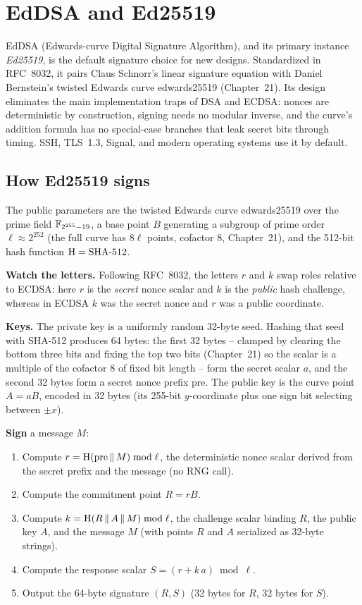 \section{EdDSA and Ed25519}
\label{ch22:eddsa}

EdDSA (Edwards-curve Digital Signature Algorithm), and its primary instance \emph{Ed25519},
is the default signature choice for new designs. Standardized in RFC~8032, it pairs Claus Schnorr's
linear signature equation with Daniel Bernstein's twisted Edwards curve edwards25519 (Chapter~21).
Its design eliminates the main implementation traps of DSA and ECDSA: nonces are deterministic by
construction, signing needs no modular inverse, and the curve's addition formula has no special-case
branches that leak secret bits through timing. SSH, TLS~1.3, Signal, and modern operating systems
use it by default.

\subsection{How Ed25519 signs}
\label{ch22:ed25519-algo}

The public parameters are the twisted Edwards curve edwards25519 over the prime field $\mathbb{F}_{2^{255}-19}$, a base point $B$ generating a subgroup of prime order $\ell \approx 2^{252}$ (the full curve has $8\ell$ points, cofactor $8$, Chapter~21), and the 512-bit hash function $\operatorname{H} = \text{SHA-512}$.

\textbf{Watch the letters.} Following RFC~8032, the letters $r$ and $k$ swap roles relative to ECDSA: here $r$ is the \emph{secret} nonce scalar and $k$ is the \emph{public} hash challenge, whereas in ECDSA $k$ was the secret nonce and $r$ was a public coordinate.

\textbf{Keys.} The private key is a uniformly random 32-byte seed. Hashing that seed with SHA-512 produces 64 bytes: the first 32 bytes -- clamped by clearing the bottom three bits and fixing the top two bits (Chapter~21) so the scalar is a multiple of the cofactor $8$ of fixed bit length -- form the secret scalar $a$, and the second 32 bytes form a secret nonce prefix $\mathrm{pre}$. The public key is the curve point $A = aB$, encoded in 32 bytes (its 255-bit $y$-coordinate plus one sign bit selecting between $\pm x$).

\textbf{Sign} a message $M$:
\begin{enumerate}
  \item Compute $r = \operatorname{H}(\mathrm{pre} \,\|\, M) \bmod \ell$, the deterministic nonce scalar derived from the secret prefix and the message (no RNG call).
  \item Compute the commitment point $R = rB$.
  \item Compute $k = \operatorname{H}(R \,\|\, A \,\|\, M) \bmod \ell$, the challenge scalar binding $R$, the public key $A$, and the message $M$ (with points $R$ and $A$ serialized as 32-byte strings).
  \item Compute the response scalar $S = (r + k\,a) \bmod \ell$.
  \item Output the 64-byte signature $(R, S)$ (32 bytes for $R$, 32 bytes for $S$).
\end{enumerate}

